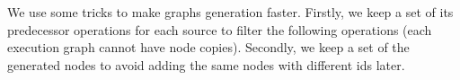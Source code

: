 
We use some tricks to make graphs generation faster.
Firstly, we keep a set of its predecessor operations for each source to filter the following operations (each execution graph cannot have node copies).
Secondly, we keep a set of the generated nodes to avoid adding the same nodes with different ids later.



